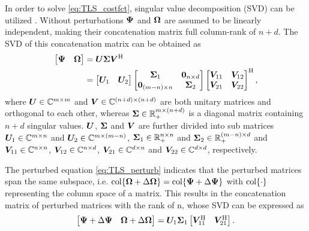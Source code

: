 In order to solve \eqref{eq:TLS_costfct}, singular value decomposition (SVD) can be utilized \cite{Markovsky07TLS, VanHuffel07TLS}. Without perturbations $\bm{\Psi}$ and $\bm{\Omega}$ are assumed to be linearly independent, making their concatenation matrix full column-rank of $n + d$. The SVD of this concatenation matrix can be obtained as 
\begin{align} \label{eq:SVD_meas}
	\begin{bmatrix} \Mtwo & \Mone \end{bmatrix}
	& = \UU \SSigma \VV^{\Hermit} \nonumber \\
	& = \begin{bmatrix} \UU_{1} & \UU_{2} \end{bmatrix} 
	\begin{bmatrix} \SSigma_{1} & \bm{0}_{n \times d} \\ \bm{0}_{(m-n) \times n} & \SSigma_{2} \end{bmatrix} 
	\begin{bmatrix} \VV_{11} & \VV_{12} \\ \VV_{21} & \VV_{22} \end{bmatrix} ^{\Hermit},
\end{align}
where $\bm{U} \in {\mathbb{C}}^{m \times m}$ and $\bm{V} \in {\mathbb{C}}^{(n + d) \times (n + d)}$ are both unitary matrices and orthogonal to each other, whereas $\bm{\Sigma} \in {\mathbb{R}}^{m \times (n + d)}_{+}$ is a diagonal matrix containing $n + d$ singular values. $\bm{U}$, $\bm{\Sigma}$ and $\bm{V}$ are further divided into sub matrices $\bm{U}_{1} \in {\mathbb{C}}^{m \times n}$ and $\bm{U}_{2} \in {\mathbb{C}}^{m \times (m-n)}$, $\bm{\Sigma}_{1} \in {\mathbb{R}}^{n \times n}_{+}$ and  $\bm{\Sigma}_{2} \in {\mathbb{R}}^{(m-n) \times d}_{+}$ and $\bm{V}_{11} \in {\mathbb{C}}^{n \times n}$, $\bm{V}_{12} \in {\mathbb{C}}^{n \times d}$, $\bm{V}_{21} \in {\mathbb{C}}^{d \times n}$ and $\bm{V}_{22} \in {\mathbb{C}}^{d \times d}$, respectively. \par

The perturbed equation \eqref{eq:TLS_perturb} indicates that the perturbed matrices span the same subspace, i.e. $ \operatorname{col} \{ \bm{\Omega} + \Delta \bm{\Omega} \} = \operatorname{col} \{ \bm{\Psi} + \Delta \bm{\Psi} \}$ with $\operatorname{col} \{ \cdot \}$ representing the column space of a matrix. This results in the concatenation matrix of perturbed matrices with the rank of n, whose SVD can be expressed as 
\begin{equation} \label{eq:SVD_perturbed}
	\begin{bmatrix} \MtwoPerturb & \MonePerturb \end{bmatrix}
	= \UU_{1} \SSigma_{1} 
	\begin{bmatrix} \VV_{11}^{\Hermit} & \VV_{21}^{\Hermit} \end{bmatrix}.
\end{equation} \par

